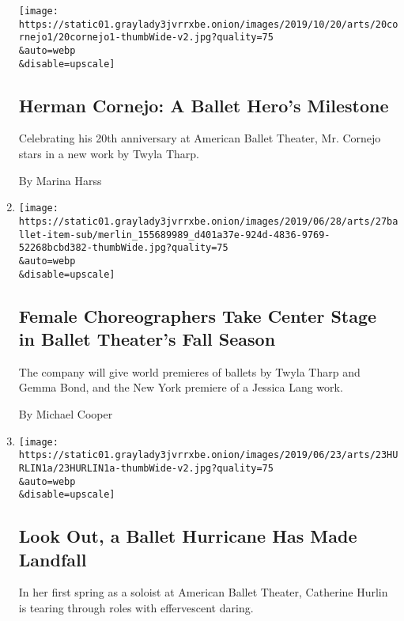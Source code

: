 \begin{enumerate}
  \texttt{[image: https://static01.graylady3jvrrxbe.onion/images/2019/10/20/arts/20cornejo1/20cornejo1-thumbWide-v2.jpg?quality=75\\\&auto=webp\\\&disable=upscale]}

  \hypertarget{herman-cornejo-a-ballet-heros-milestone}{%
  \subsection{Herman Cornejo: A Ballet Hero's
  Milestone}\label{herman-cornejo-a-ballet-heros-milestone}}

  Celebrating his 20th anniversary at American Ballet Theater, Mr.
  Cornejo stars in a new work by Twyla Tharp.

  By Marina Harss
\item
  \href{/2019/06/27/arts/dance/female-choreographers-american-ballet-theater-season.html}{}

  \texttt{[image: https://static01.graylady3jvrrxbe.onion/images/2019/06/28/arts/27ballet-item-sub/merlin\_155689989\_d401a37e-924d-4836-9769-52268bcbd382-thumbWide.jpg?quality=75\\\&auto=webp\\\&disable=upscale]}

  \hypertarget{female-choreographers-take-center-stage-in-ballet-theaters-fall-season}{%
  \subsection{Female Choreographers Take Center Stage in Ballet
  Theater's Fall
  Season}\label{female-choreographers-take-center-stage-in-ballet-theaters-fall-season}}

  The company will give world premieres of ballets by Twyla Tharp and
  Gemma Bond, and the New York premiere of a Jessica Lang work.

  By Michael Cooper
\item
  \href{/2019/06/21/arts/dance/catherine-hurlin-american-ballet-theater.html}{}

  \texttt{[image: https://static01.graylady3jvrrxbe.onion/images/2019/06/23/arts/23HURLIN1a/23HURLIN1a-thumbWide-v2.jpg?quality=75\\\&auto=webp\\\&disable=upscale]}

  \hypertarget{look-out-a-ballet-hurricane-has-made-landfall}{%
  \subsection{Look Out, a Ballet Hurricane Has Made
  Landfall}\label{look-out-a-ballet-hurricane-has-made-landfall}}

  In her first spring as a soloist at American Ballet Theater, Catherine
  Hurlin is tearing through roles with effervescent daring.


\end{enumerate}

